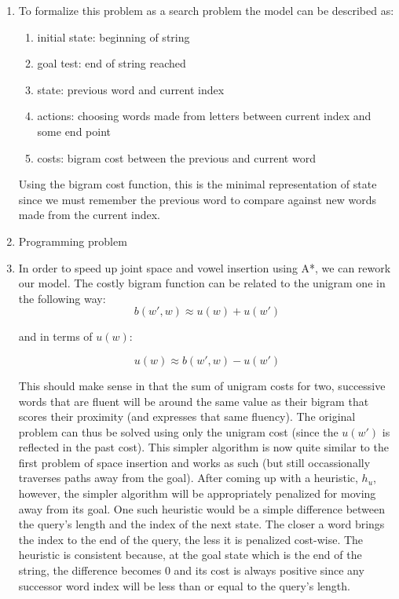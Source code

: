 \documentclass[12pt]{article}
\begin{document}
\begin{enumerate}[label=(\alph*)]
	\item To formalize this problem as a search problem the model can be
		described as:

		\begin{enumerate}
			\item initial state: beginning of string
			\item goal test: end of string reached
			\item state: previous word and current index
			\item actions: choosing words made from letters between current index and some
				end point
			\item costs: bigram cost between the previous and current word
		\end{enumerate}

		Using the bigram cost function, this is the minimal representation of state
		since we must remember the previous word to compare against new words made
		from the current index.
	
	\item Programming problem

	\item In order to speed up joint space and vowel insertion using A*,
		we can rework our model. The costly bigram function can be related
		to the unigram one in the following way:
		\[
			b(w',w) \approx u(w) + u(w')
		\]

		and in terms of \(u(w)\):

		\[
			u(w) \approx b(w',w) - u(w')
		\]

		This should make sense in that the sum of unigram costs for two, successive
		words that are fluent will be around the same value as their bigram that
		scores their proximity (and expresses that same fluency). The original problem
		can thus be solved using only the unigram cost (since the \(u(w')\) is
		reflected in the past cost). This simpler algorithm is now quite similar to
		the first problem of space insertion and works as such (but still occassionally
		traverses paths away from the goal). After coming up with a heuristic, \(h_u\),
		however, the simpler algorithm will
		be appropriately penalized for moving away from its goal. One such
		heuristic would be a simple difference between the query's length and
		the index of the next state. The closer a word brings the index to the
		end of the query, the less it is penalized cost-wise. The heuristic is consistent
		because, at the goal state which is the end of the string, the difference
		becomes \(0\) and its cost is always positive since any successor word
		index will be less than or equal to the query's length.

\end{enumerate}
\end{document}
